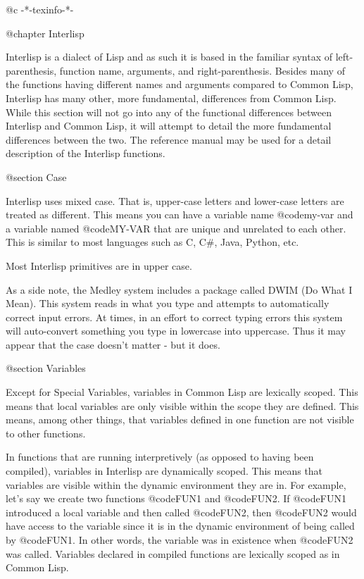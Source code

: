 @c -*-texinfo-*-

@chapter Interlisp

Interlisp is a dialect of Lisp and as such it is based in the familiar
syntax of left-parenthesis, function name, arguments, and
right-parenthesis.  Besides many of the functions having different
names and arguments compared to Common Lisp, Interlisp has many other,
more fundamental, differences from Common Lisp.  While this section
will not go into any of the functional differences between Interlisp
and Common Lisp, it will attempt to detail the more fundamental
differences between the two.  The reference manual may be used for a
detail description of the Interlisp functions.

@section Case

Interlisp uses mixed case.  That is, upper-case letters and lower-case
letters are treated as different.  This means you can have a variable
name @code{my-var} and a variable named @code{MY-VAR} that are unique and
unrelated to each other.  This is similar to most languages such as
C, C#, Java, Python, etc.

Most Interlisp primitives are in upper case.

As a side note, the Medley system includes a package called DWIM (Do
What I Mean).  This system reads in what you type and attempts to
automatically correct input errors.  At times, in an effort to correct
typing errors this system will auto-convert something you type in
lowercase into uppercase.  Thus it may appear that the case doesn't
matter - but it does.

@section Variables

Except for Special Variables, variables in Common Lisp are lexically
scoped.  This means that local variables are only visible within the
scope they are defined.  This means, among other things, that
variables defined in one function are not visible to other functions.

In functions that are running interpretively (as opposed to having
been compiled), variables in Interlisp are dynamically scoped.  This
means that variables are visible within the dynamic environment they
are in.  For example, let's say we create two functions @code{FUN1}
and @code{FUN2}.  If @code{FUN1} introduced a local variable and then
called @code{FUN2}, then @code{FUN2} would have access to the variable
since it is in the dynamic environment of being called by @code{FUN1}.
In other words, the variable was in existence when @code{FUN2} was
called.  Variables declared in compiled functions are lexically scoped
as in Common Lisp.

